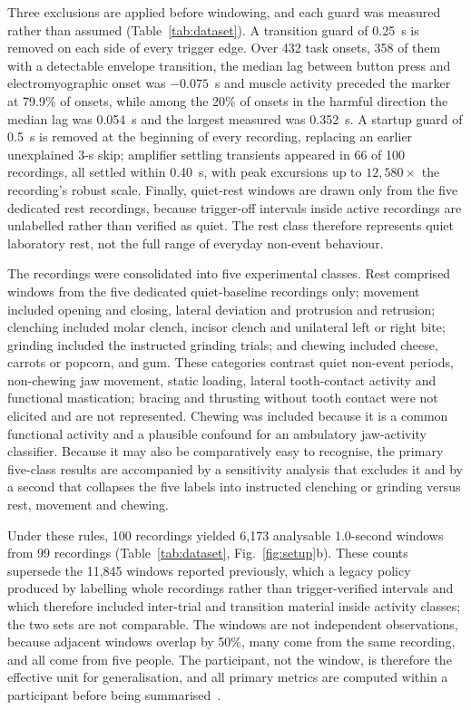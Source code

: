 \documentclass[pdflatex,sn-nature,iicol]{sn-jnl}
\begin{document}
Three exclusions are applied before windowing, and each guard was measured rather than assumed (Table~\ref{tab:dataset}). A transition guard of 0.25~s is removed on each side of every trigger edge. Over 432 task onsets, 358 of them with a detectable envelope transition, the median lag between button press and electromyographic onset was $-0.075$~s and muscle activity preceded the marker at 79.9\% of onsets, while among the 20\% of onsets in the harmful direction the median lag was 0.054~s and the largest measured was 0.352~s. A startup guard of 0.5~s is removed at the beginning of every recording, replacing an earlier unexplained 3-s skip; amplifier settling transients appeared in 66 of 100 recordings, all settled within 0.40~s, with peak excursions up to $12{,}580\times$ the recording's robust scale. Finally, quiet-rest windows are drawn only from the five dedicated rest recordings, because trigger-off intervals inside active recordings are unlabelled rather than verified as quiet. The rest class therefore represents quiet laboratory rest, not the full range of everyday non-event behaviour.

The recordings were consolidated into five experimental classes. Rest comprised windows from the five dedicated quiet-baseline recordings only; movement included opening and closing, lateral deviation and protrusion and retrusion; clenching included molar clench, incisor clench and unilateral left or right bite; grinding included the instructed grinding trials; and chewing included cheese, carrots or popcorn, and gum. These categories contrast quiet non-event periods, non-chewing jaw movement, static loading, lateral tooth-contact activity and functional mastication; bracing and thrusting without tooth contact were not elicited and are not represented. Chewing was included because it is a common functional activity and a plausible confound for an ambulatory jaw-activity classifier. Because it may also be comparatively easy to recognise, the primary five-class results are accompanied by a sensitivity analysis that excludes it and by a second that collapses the five labels into instructed clenching or grinding versus rest, movement and chewing.

Under these rules, 100 recordings yielded 6,173 analysable 1.0-second windows from 99 recordings (Table~\ref{tab:dataset}, Fig.~\ref{fig:setup}b). These counts supersede the 11,845 windows reported previously, which a legacy policy produced by labelling whole recordings rather than trigger-verified intervals and which therefore included inter-trial and transition material inside activity classes; the two sets are not comparable. The windows are not independent observations, because adjacent windows overlap by 50\%, many come from the same recording, and all come from five people. The participant, not the window, is therefore the effective unit for generalisation, and all primary metrics are computed within a participant before being summarised~\cite{saeb2017need,little2017using,roberts2017cross}.
\end{document}
